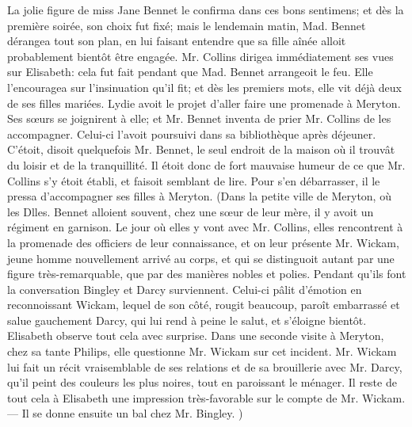 La jolie figure de miss Jane Bennet le confirma dans ces bons sentimens; et dès\setcounter{page}{400} la première soirée, son choix fut fixé; mais le lendemain matin, Mad. Bennet dérangea tout son plan, en lui faisant entendre que sa fille aînée alloit probablement bientôt être engagée.
Mr. Collins dirigea immédiatement ses vues sur Elisabeth: cela fut fait pendant que Mad. Bennet arrangeoit le feu. Elle l'encouragea sur l'insinuation qu'il fit; et dès les premiers mots, elle vit déjà deux de ses filles mariées.
Lydie avoit le projet d'aller faire une promenade à Meryton. Ses sœurs se joignirent à elle; et Mr. Bennet inventa de prier Mr. Collins de les accompagner. Celui-ci l'avoit poursuivi dans sa bibliothèque après déjeuner. C'étoit, disoit quelquefois Mr. Bennet, le seul endroit de la maison où il trouvât du loisir et de la tranquillité. Il étoit donc de fort mauvaise humeur de ce que Mr. Collins s'y étoit établi, et faisoit semblant de lire. Pour s'en débarrasser, il le pressa d'accompagner ses filles à Meryton. (Dans la petite ville de Meryton, où les Dlles. Bennet alloient souvent, chez une sœur de leur mère, il y avoit un régiment en garnison. Le jour où elles y vont avec Mr. Collins, elles rencontrent à la promenade des officiers\setcounter{page}{401} de leur connaissance, et on leur présente Mr. Wickam, jeune homme nouvellement arrivé au corps, et qui se distinguoit autant par une figure très-remarquable, que par des manières nobles et polies. Pendant qu'ils font la conversation Bingley et Darcy surviennent. Celui-ci pâlit d'émotion en reconnoissant Wickam, lequel de son côté, rougit beaucoup, paroît embarrassé et salue gauchement Darcy, qui lui rend à peine le salut, et s'éloigne bientôt. Elisabeth observe tout cela avec surprise.
Dans une seconde visite à Meryton, chez sa tante Philips, elle questionne Mr. Wickam sur cet incident. Mr. Wickam lui fait un récit vraisemblable de ses relations et de sa brouillerie avec Mr. Darcy, qu'il peint des couleurs les plus noires, tout en paroissant le ménager. Il reste de tout cela à Elisabeth une impression très-favorable sur le compte de Mr. Wickam. — Il se donne ensuite un bal chez Mr. Bingley. )
